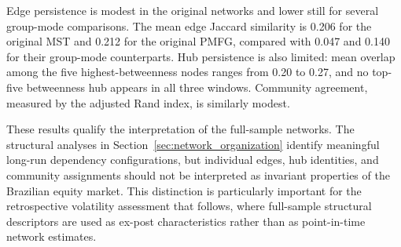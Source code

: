 Edge persistence is modest in the original networks and lower still for several group-mode comparisons. The mean edge Jaccard similarity is 0.206 for the original MST and 0.212 for the original PMFG, compared with 0.047 and 0.140 for their group-mode counterparts. Hub persistence is also limited: mean overlap among the five highest-betweenness nodes ranges from 0.20 to 0.27, and no top-five betweenness hub appears in all three windows. Community agreement, measured by the adjusted Rand index, is similarly modest.

These results qualify the interpretation of the full-sample networks. The structural analyses in Section~\ref{sec:network_organization} identify meaningful long-run dependency configurations, but individual edges, hub identities, and community assignments should not be interpreted as invariant properties of the Brazilian equity market. This distinction is particularly important for the retrospective volatility assessment that follows, where full-sample structural descriptors are used as ex-post characteristics rather than as point-in-time network estimates.

